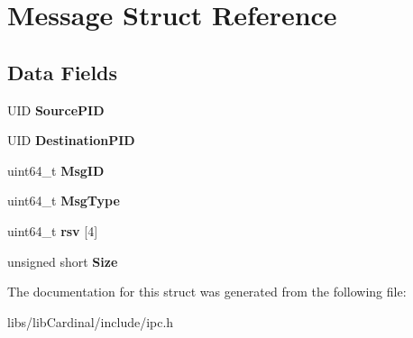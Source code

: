 \hypertarget{structMessage}{}\section{Message Struct Reference}
\label{structMessage}
\subsection*{Data Fields}
\begin{DoxyCompactItemize}
\item 
U\+ID {\bfseries Source\+P\+ID}\hypertarget{structMessage_a1758f562d9624388acbb602f46620f85}{}\label{structMessage_a1758f562d9624388acbb602f46620f85}

\item 
U\+ID {\bfseries Destination\+P\+ID}\hypertarget{structMessage_a9f80472ee2d4c47d2843d770192c496c}{}\label{structMessage_a9f80472ee2d4c47d2843d770192c496c}

\item 
uint64\+\_\+t {\bfseries Msg\+ID}\hypertarget{structMessage_a69331dfb560aa706c8ee22ee2abcde41}{}\label{structMessage_a69331dfb560aa706c8ee22ee2abcde41}

\item 
uint64\+\_\+t {\bfseries Msg\+Type}\hypertarget{structMessage_ab7b9a9d0dff38bc532eacf9fd60d9b21}{}\label{structMessage_ab7b9a9d0dff38bc532eacf9fd60d9b21}

\item 
uint64\+\_\+t {\bfseries rsv} \mbox{[}4\mbox{]}\hypertarget{structMessage_aac7beebd8893b5926b6ccbf26cd848d4}{}\label{structMessage_aac7beebd8893b5926b6ccbf26cd848d4}

\item 
unsigned short {\bfseries Size}\hypertarget{structMessage_a233839529bde6260f81fe40f2ddfeaad}{}\label{structMessage_a233839529bde6260f81fe40f2ddfeaad}

\end{DoxyCompactItemize}


The documentation for this struct was generated from the following file\+:\begin{DoxyCompactItemize}
\item 
libs/lib\+Cardinal/include/ipc.\+h\end{DoxyCompactItemize}
